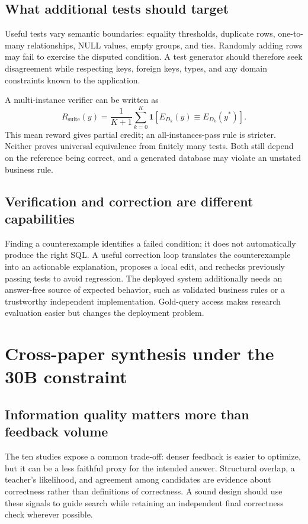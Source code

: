 \documentclass[11pt,a4paper]{article}
\begin{document}
\subsection{What additional tests should target}
Useful tests vary semantic boundaries: equality thresholds, duplicate rows, one-to-many relationships, NULL values, empty groups, and ties. Randomly adding rows may fail to exercise the disputed condition. A test generator should therefore seek disagreement while respecting keys, foreign keys, types, and any domain constraints known to the application.

A multi-instance verifier can be written as
\begin{equation}
R_{\mathrm{suite}}(y)=\frac{1}{K+1}\sum_{k=0}^{K}
\mathbf{1}[E_{D_k}(y)\equiv E_{D_k}(y^*)].
\end{equation}
This mean reward gives partial credit; an all-instances-pass rule is stricter. Neither proves universal equivalence from finitely many tests. Both still depend on the reference being correct, and a generated database may violate an unstated business rule.

\subsection{Verification and correction are different capabilities}
Finding a counterexample identifies a failed condition; it does not automatically produce the right SQL. A useful correction loop translates the counterexample into an actionable explanation, proposes a local edit, and rechecks previously passing tests to avoid regression. The deployed system additionally needs an answer-free source of expected behavior, such as validated business rules or a trustworthy independent implementation. Gold-query access makes research evaluation easier but changes the deployment problem.

\clearpage
\section{Cross-paper synthesis under the 30B constraint}
\subsection{Information quality matters more than feedback volume}
The ten studies expose a common trade-off: denser feedback is easier to optimize, but it can be a less faithful proxy for the intended answer. Structural overlap, a teacher's likelihood, and agreement among candidates are evidence about correctness rather than definitions of correctness. A sound design should use these signals to guide search while retaining an independent final correctness check wherever possible.
\end{document}
